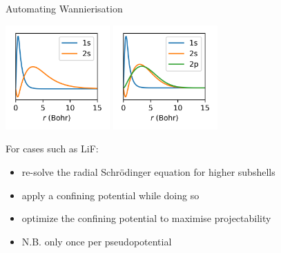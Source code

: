 \documentclass[xcolor=table,aspectratio=169]{beamer}
\numberwithin{equation}{section}
\begin{document}
\begin{frame}{Automating Wannierisation}

   \vspace{-2ex}
   \begin{center}
      \includegraphics[width=0.3\textwidth]{figures/plot_paos/old_projs.png}
      \raisebox{0.15\textwidth}{\huge $\rightarrow$}
      \includegraphics[width=0.3\textwidth]{figures/plot_paos/new_projs.png}
   \end{center}

   \vspace{-2ex}
   For cases such as LiF:

   \begin{itemize}[<+->]
      \item re-solve the radial Schrödinger equation for higher subshells
      \item apply a confining potential while doing so
      \item optimize the confining potential to maximise projectability
      \item N.B. only once per pseudopotential
   \end{itemize}


\end{frame}
\end{document}
